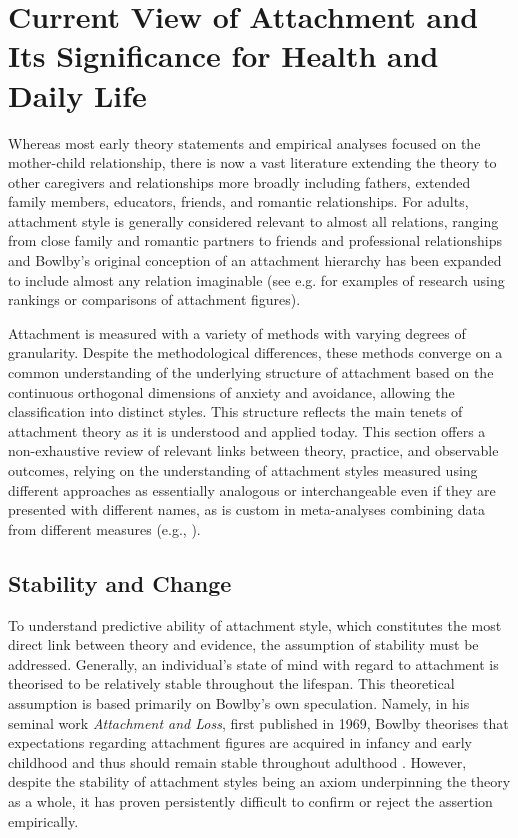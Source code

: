\documentclass[12pt]{report}
\begin{document}
\section{Current View of Attachment and Its Significance for Health and Daily Life}
Whereas most early theory statements and empirical analyses focused on the mother-child relationship, there is now a vast literature extending the theory to other caregivers and relationships more broadly including fathers, extended family members, educators, friends, and romantic relationships. For adults, attachment style is generally considered relevant to almost all relations, ranging from close family and romantic partners to friends and professional relationships and Bowlby's original conception of an attachment hierarchy \cite{Bowlby1969attachment} has been expanded to include almost any relation imaginable (see e.g. \cite{Rosenthal2010, Karantzas2011ArthritisAS, Rowe2005, Tancredy2006} for examples of research using rankings or comparisons of attachment figures).

Attachment is measured with a variety of methods with varying degrees of granularity. Despite the methodological differences, these methods converge on a common understanding of the underlying structure of attachment based on the continuous orthogonal dimensions of anxiety and avoidance, allowing the classification into distinct styles.
This structure reflects the main tenets of attachment theory as it is understood and applied today.
This section offers a non-exhaustive review of relevant links between theory, practice, and observable outcomes, relying on the understanding of attachment styles measured using different approaches as essentially analogous or interchangeable even if they are presented with different names, as is custom in meta-analyses combining data from different measures (e.g., \cite{McConnell2011,Pinquart2013}).

\subsection{Stability and Change}
To understand predictive ability of attachment style, which constitutes the most direct link between theory and evidence, the assumption of stability must be addressed. Generally, an individual's state of mind with regard to attachment is theorised to be relatively stable throughout the lifespan. This theoretical assumption is based primarily on Bowlby's own speculation. Namely, in his seminal work \textit{Attachment and Loss}, first published in 1969, Bowlby theorises that expectations regarding attachment figures are acquired in infancy and early childhood and thus should remain stable throughout adulthood \cite{Bowlby1969attachment, Bowlby1973separation,Bowlby1980loss}. However, despite the stability of attachment styles being an axiom underpinning the theory as a whole, it has proven persistently difficult to confirm or reject the assertion empirically.
\end{document}
